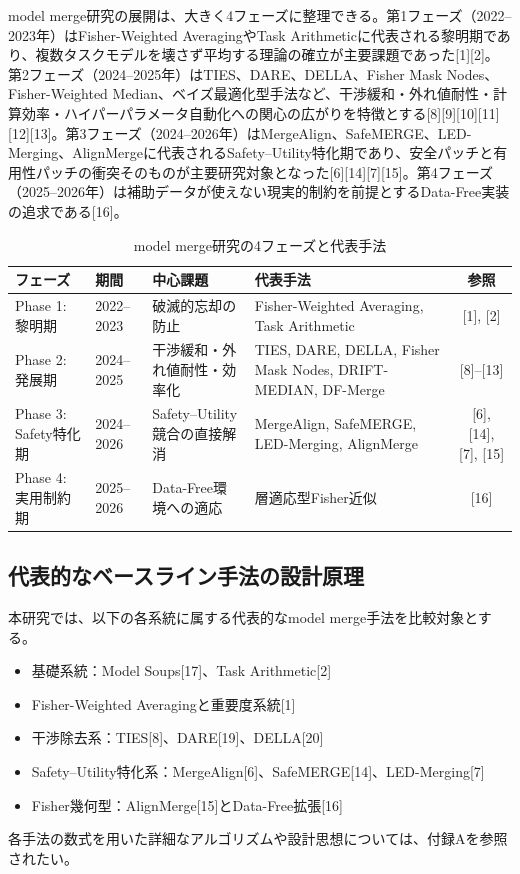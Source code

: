 \documentclass{article}
\begin{document}
model merge研究の展開は、大きく4フェーズに整理できる。第1フェーズ（2022–2023年）はFisher-Weighted AveragingやTask Arithmeticに代表される黎明期であり、複数タスクモデルを壊さず平均する理論の確立が主要課題であった[1][2]。第2フェーズ（2024–2025年）はTIES、DARE、DELLA、Fisher Mask Nodes、Fisher-Weighted Median、ベイズ最適化型手法など、干渉緩和・外れ値耐性・計算効率・ハイパーパラメータ自動化への関心の広がりを特徴とする[8][9][10][11][12][13]。第3フェーズ（2024–2026年）はMergeAlign、SafeMERGE、LED-Merging、AlignMergeに代表されるSafety–Utility特化期であり、安全パッチと有用性パッチの衝突そのものが主要研究対象となった[6][14][7][15]。第4フェーズ（2025–2026年）は補助データが使えない現実的制約を前提とするData-Free実装の追求である[16]。
\begin{table}[H]
\centering
\caption{model merge研究の4フェーズと代表手法}
\label{tab:merge-phases}
\small
\begin{tabular}{p{2.3cm}p{1.8cm}p{3.2cm}p{5.2cm}c}
\toprule
フェーズ & 期間 & 中心課題 & 代表手法 & 参照 \\
\midrule
Phase 1: 黎明期 & 2022--2023 & 破滅的忘却の防止 & Fisher-Weighted Averaging, Task Arithmetic & [1], [2] \\

Phase 2: 発展期 & 2024--2025 & 干渉緩和・外れ値耐性・効率化 & TIES, DARE, DELLA, Fisher Mask Nodes, DRIFT-MEDIAN, DF-Merge & [8]--[13] \\

Phase 3: Safety特化期 & 2024--2026 & Safety--Utility競合の直接解消 & MergeAlign, SafeMERGE, LED-Merging, AlignMerge & [6], [14], [7], [15] \\

Phase 4: 実用制約期 & 2025--2026 & Data-Free環境への適応
& 層適応型Fisher近似 & [16] \\
\bottomrule
\end{tabular}
\end{table}

\subsection{代表的なベースライン手法の設計原理}
本研究では、以下の各系統に属する代表的なmodel merge手法を比較対象とする。
\begin{itemize}
    \item 基礎系統：Model Soups[17]、Task Arithmetic[2]
    \item Fisher-Weighted Averagingと重要度系統[1]
    \item 干渉除去系：TIES[8]、DARE[19]、DELLA[20]
    \item Safety--Utility特化系：MergeAlign[6]、SafeMERGE[14]、LED-Merging[7]
    \item Fisher幾何型：AlignMerge[15]とData-Free拡張[16]
\end{itemize}
各手法の数式を用いた詳細なアルゴリズムや設計思想については、付録Aを参照されたい。
\end{document}
